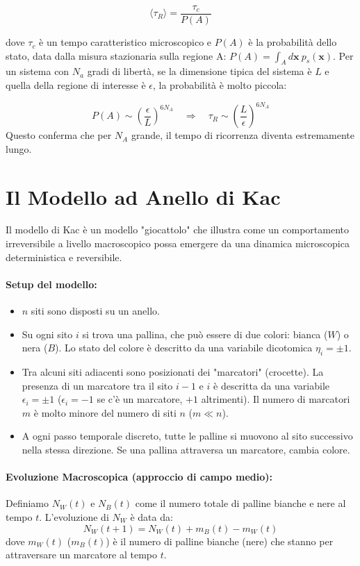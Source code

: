 \begin{equation}
\langle\tau_{R}\rangle=\frac{\tau_c}{P(A)}
\end{equation}

dove $\tau_c$ è un tempo caratteristico microscopico e $P(A)$ è la probabilità dello stato, data dalla misura stazionaria sulla regione A: $P(A)=\int_{A}d\mathbf{x}~p_{s}(\mathbf{x})$. Per un sistema con $N_a$ gradi di libertà, se la dimensione tipica del sistema è $L$ e quella della regione di interesse è $\epsilon$, la probabilità è molto piccola:

\begin{equation}
P(A)\sim(\frac{\epsilon}{L})^{6N_{A}} \quad \Rightarrow \quad \tau_R \sim (\frac{L}{\epsilon})^{6N_{A}}
\end{equation}
Questo conferma che per $N_A$ grande, il tempo di ricorrenza diventa estremamente lungo.

\section{Il Modello ad Anello di Kac}
Il modello di Kac è un modello "giocattolo" che illustra come un comportamento irreversibile a livello macroscopico possa emergere da una dinamica microscopica deterministica e reversibile.

\paragraph{Setup del modello:}
\begin{itemize}
    \item $n$ siti sono disposti su un anello.
    \item Su ogni sito $i$ si trova una pallina, che può essere di due colori: bianca ($W$) o nera ($B$). Lo stato del colore è descritto da una variabile dicotomica $\eta_i = \pm 1$.
    \item Tra alcuni siti adiacenti sono posizionati dei "marcatori" (crocette). La presenza di un marcatore tra il sito $i-1$ e $i$ è descritta da una variabile $\epsilon_i = \pm 1$ ($\epsilon_i = -1$ se c'è un marcatore, $+1$ altrimenti). Il numero di marcatori $m$ è molto minore del numero di siti $n$ ($m \ll n$).
    \item A ogni passo temporale discreto, tutte le palline si muovono al sito successivo nella stessa direzione. Se una pallina attraversa un marcatore, cambia colore.
\end{itemize}

\paragraph{Evoluzione Macroscopica (approccio di campo medio):}
Definiamo $N_W(t)$ e $N_B(t)$ come il numero totale di palline bianche e nere al tempo $t$. L'evoluzione di $N_W$ è data da:
\begin{equation}
N_{W}(t+1)=N_{W}(t)+m_{B}(t)-m_{W}(t)
\end{equation}
dove $m_W(t)$ ($m_B(t)$) è il numero di palline bianche (nere) che stanno per attraversare un marcatore al tempo $t$.

